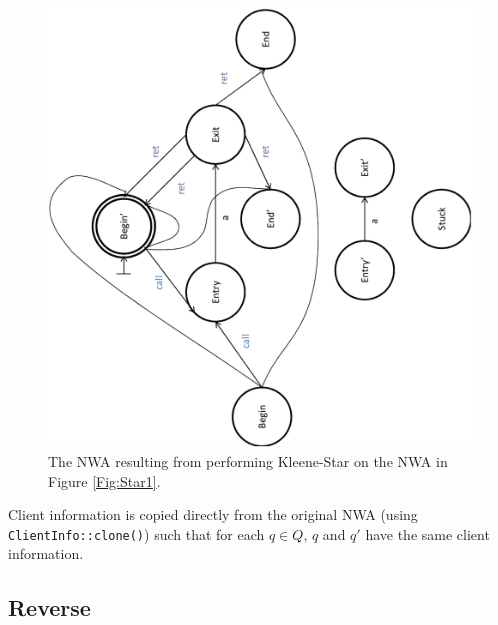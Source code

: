 \begin{figure}[p]
  \centering
    \includegraphics[width=12cm]{Figures/Figure12}
  \caption{The NWA resulting from performing Kleene-Star on the NWA in Figure \ref{Fig:Star1}.}
  \label{Fig:Star2}
\end{figure}

\goodbreak Client information is copied directly from the original NWA (using
\texttt{ClientInfo::clone()}) such that for each $q \in Q$, $q$
and $q'$ have the same client information.




\subsection{Reverse}
\label{Se:Reverse}

